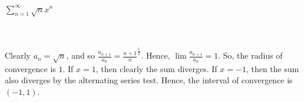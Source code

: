 $\sum_{n=1}^{\infty} \sqrt{n}x^n$\\\\

\begin{solution}\renewcommand{\qedsymbol}{}\ \\
    Clearly $a_n=\sqrt{n}$, and so $\frac{a_{n+1}}{a_n}=\frac{n+1}{n}^{\frac12}$. Hence,
    $\lim\frac{a_{n+1}}{a_n}=1$. So, the radius of convergence is $1$. If $x=1$, then clearly the sum
    diverges. If $x=-1$, then the sum also diverges by the alternating series test. Hence, the interval
    of convergence is $(-1,1)$.

\end{solution}